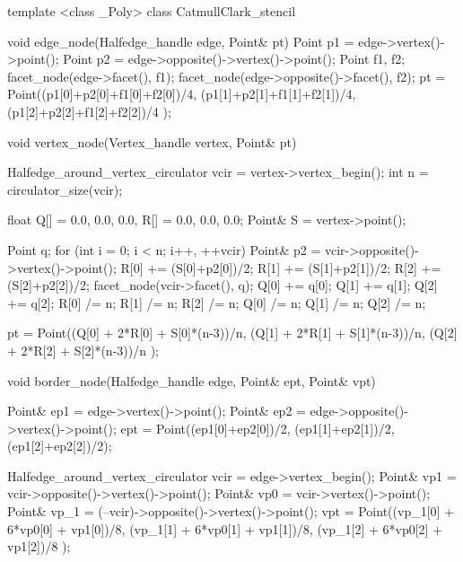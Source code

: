 \begin{ccExampleCode}
template <class _Poly>
class CatmullClark_stencil {
   void edge_node(Halfedge_handle edge, Point& pt) {
    Point p1 = edge->vertex()->point();
    Point p2 = edge->opposite()->vertex()->point();
    Point f1, f2;
    facet_node(edge->facet(), f1);
    facet_node(edge->opposite()->facet(), f2);
    pt = Point((p1[0]+p2[0]+f1[0]+f2[0])/4,
               (p1[1]+p2[1]+f1[1]+f2[1])/4,
               (p1[2]+p2[2]+f1[2]+f2[2])/4 );
  }
 
  void vertex_node(Vertex_handle vertex, Point& pt) {
    Halfedge_around_vertex_circulator vcir = vertex->vertex_begin();
    int n = circulator_size(vcir);    

    float Q[] = {0.0, 0.0, 0.0}, R[] = {0.0, 0.0, 0.0};
    Point& S = vertex->point();
    
    Point q;
    for (int i = 0; i < n; i++, ++vcir) {
      Point& p2 = vcir->opposite()->vertex()->point();
      R[0] += (S[0]+p2[0])/2;
      R[1] += (S[1]+p2[1])/2;
      R[2] += (S[2]+p2[2])/2;
      facet_node(vcir->facet(), q);
      Q[0] += q[0];      
      Q[1] += q[1];      
      Q[2] += q[2];
    }
    R[0] /= n;    R[1] /= n;    R[2] /= n;
    Q[0] /= n;    Q[1] /= n;    Q[2] /= n;
      
    pt = Point((Q[0] + 2*R[0] + S[0]*(n-3))/n,
               (Q[1] + 2*R[1] + S[1]*(n-3))/n,
               (Q[2] + 2*R[2] + S[2]*(n-3))/n );
  }

  void border_node(Halfedge_handle edge, Point& ept, Point& vpt) {
    Point& ep1 = edge->vertex()->point();
    Point& ep2 = edge->opposite()->vertex()->point();
    ept = Point((ep1[0]+ep2[0])/2, (ep1[1]+ep2[1])/2, (ep1[2]+ep2[2])/2);

    Halfedge_around_vertex_circulator vcir = edge->vertex_begin();
    Point& vp1  = vcir->opposite()->vertex()->point();
    Point& vp0  = vcir->vertex()->point();
    Point& vp_1 = (--vcir)->opposite()->vertex()->point();
    vpt = Point((vp_1[0] + 6*vp0[0] + vp1[0])/8,
                (vp_1[1] + 6*vp0[1] + vp1[1])/8,
                (vp_1[2] + 6*vp0[2] + vp1[2])/8 );
  }
}
\end{ccExampleCode}


